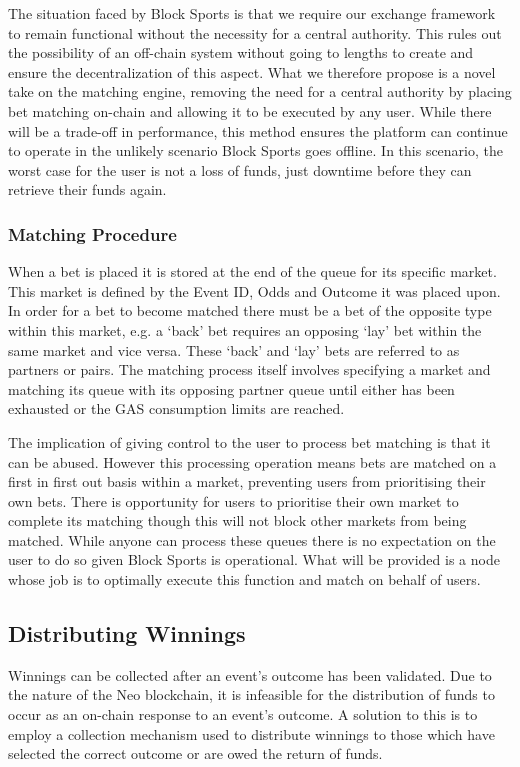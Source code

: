 \documentclass{article}
\begin{document}
The situation faced by Block Sports is that we require our exchange framework to remain functional without the necessity for a central authority. This rules out the possibility of an off-chain system without going to lengths to create and ensure the decentralization of this aspect. What we therefore propose is a novel take on the matching engine, removing the need for a central authority by placing bet matching on-chain and allowing it to be executed by any user. While there will be a trade-off in performance, this method ensures the platform can continue to operate in the unlikely scenario Block Sports goes offline. In this scenario, the worst case for the user is not a loss of funds, just downtime before they can retrieve their funds again.

\subsubsection{Matching Procedure} \label{matching-procedure}
When a bet is placed it is stored at the end of the queue for its specific market. This market is defined by the Event ID, Odds and Outcome it was placed upon. In order for a bet to become matched there must be a bet of the opposite type within this market, e.g. a ‘back’ bet requires an opposing ‘lay’ bet within the same market and vice versa. These ‘back’ and ‘lay’ bets are referred to as partners or pairs. The matching process itself involves specifying a market and matching its queue with its opposing partner queue until either has been exhausted or the GAS consumption limits are reached.

The implication of giving control to the user to process bet matching is that it can be abused. However this processing operation means bets are matched on a first in first out basis within a market, preventing users from prioritising their own bets. There is opportunity for users to prioritise their own market to complete its matching though this will not block other markets from being matched. While anyone can process these queues there is no expectation on the user to do so given Block Sports is operational. What will be provided is a node whose job is to optimally execute this function and match on behalf of users.


	\subsection{Distributing Winnings} \label{distributing-winnings}
Winnings can be collected after an event’s outcome has been validated. Due to the nature of the Neo blockchain, it is infeasible for the distribution of funds to occur as an on-chain response to an event’s outcome. A solution to this is to employ a collection mechanism used to distribute winnings to those which have selected the correct outcome or are owed the return of funds.
\end{document}
